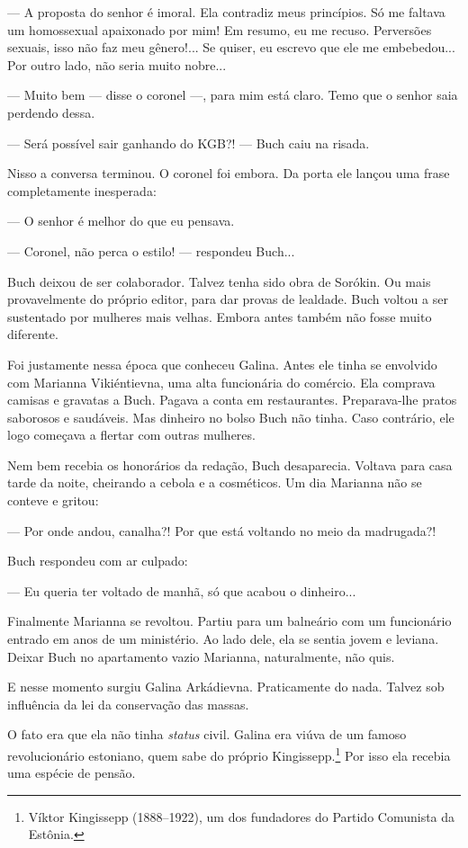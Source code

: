 --- A proposta do senhor é imoral. Ela contradiz meus princípios. Só me
faltava um homossexual apaixonado por mim! Em resumo, eu me recuso.
Perversões sexuais, isso não faz meu gênero!... Se quiser, eu escrevo
que ele me embebedou... Por outro lado, não seria muito nobre...

--- Muito bem --- disse o coronel ---, para mim está claro. Temo que o
senhor saia perdendo dessa.

--- Será possível sair ganhando do KGB?! --- Buch caiu na risada.

Nisso a conversa terminou. O coronel foi embora. Da porta ele lançou uma
frase completamente inesperada:

--- O senhor é melhor do que eu pensava.

--- Coronel, não perca o estilo! --- respondeu Buch...

Buch deixou de ser colaborador. Talvez tenha sido obra de Sorókin. Ou
mais provavelmente do próprio editor, para dar provas de lealdade. Buch
voltou a ser sustentado por mulheres mais velhas. Embora antes também
não fosse muito diferente.

Foi justamente nessa época que conheceu Galina. Antes ele tinha se
envolvido com Marianna Vikiéntievna, uma alta funcionária do comércio.
Ela comprava camisas e gravatas a Buch. Pagava a conta em restaurantes.
Preparava-lhe pratos saborosos e saudáveis. Mas dinheiro no bolso Buch
não tinha. Caso contrário, ele logo começava a flertar com outras
mulheres.

Nem bem recebia os honorários da redação, Buch desaparecia. Voltava para
casa tarde da noite, cheirando a cebola e a cosméticos. Um dia Marianna
não se conteve e gritou:

--- Por onde andou, canalha?! Por que está voltando no meio da
madrugada?!

Buch respondeu com ar culpado:

--- Eu queria ter voltado de manhã, só que acabou o dinheiro...

Finalmente Marianna se revoltou. Partiu para um balneário com um
funcionário entrado em anos de um ministério. Ao lado dele, ela se
sentia jovem e leviana. Deixar Buch no apartamento vazio Marianna,
naturalmente, não quis.

E nesse momento surgiu Galina Arkádievna. Praticamente do nada. Talvez
sob influência da lei da conservação das massas.

O fato era que ela não tinha \emph{status} civil. Galina era viúva de um
famoso revolucionário estoniano, quem sabe do próprio
Kingissepp.\footnote{Víktor Kingissepp (1888--1922), um dos fundadores
  do Partido Comunista da Estônia.} Por isso ela recebia uma espécie de
pensão.


